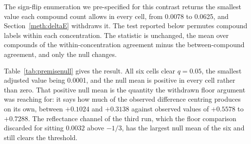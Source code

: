 \documentclass[journal=jacsat,manuscript=suppinfo,margin=1in]{achemso}
\begin{document}
The sign-flip enumeration we pre-specified for this contrast returns the
smallest value each compound count allows in every cell, from 0.0078 to 0.0625,
and Section~\ref{meth:deltaE} withdraws it. The test reported below permutes
compound labels within each concentration. The statistic is unchanged, the mean
over compounds of the within-concentration agreement minus the
between-compound agreement, and only the null changes.

\begin{table}[!htb]
\centering
\caption{Premise test under the label-permutation null. The statistic is the
mean over compounds of (agreement with itself across concentrations) minus
(agreement with the other compounds' consensus patterns). The null permutes
compound labels within each concentration. Fixing the first concentration's
labels leaves $(n!)^{C-1}$ distinct relabellings, which is enumerable for the
four-compound set and sampled for the others.}
\label{tab:premisenull}

\end{table}

Table~\ref{tab:premisenull} gives the result. All six cells clear
$q = 0.05$, the smallest adjusted value being 0.0001, and the null mean is
positive in every cell rather than zero. That positive null mean is the
quantity the withdrawn floor argument was reaching for: it says how much of
the observed difference centring produces on its own, between $+0.1024$ and
$+0.3138$ against observed values of $+0.5578$ to $+0.7288$. The reflectance
channel of the third run, which the floor comparison discarded for sitting
$0.0032$ above $-1/3$, has the largest null mean of the six and still clears
the threshold.
\end{document}
